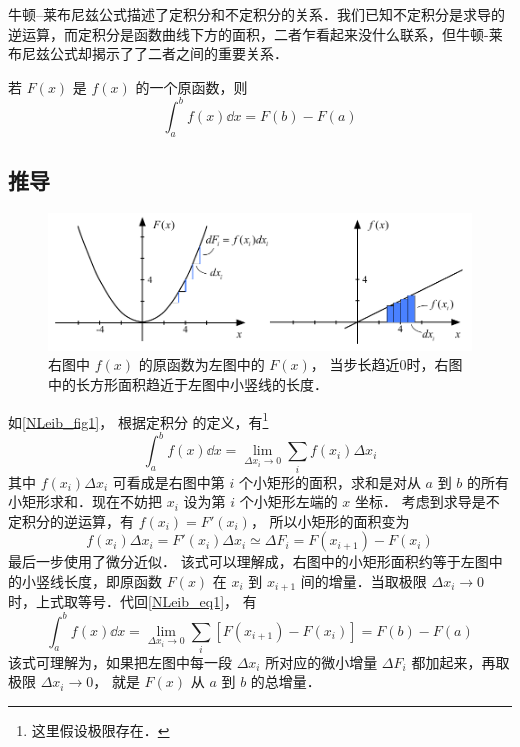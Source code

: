 

牛顿--莱布尼兹公式描述了定积分和不定积分的关系．我们已知不定积分是求导的逆运算，而定积分是函数曲线下方的面积，二者乍看起来没什么联系，但牛顿-莱布尼兹公式却揭示了了二者之间的重要关系．

若 $F(x)$ 是 $f(x)$ 的一个原函数，则
\begin{equation}\label{NLeib_eq1}
\int_a^b f(x) \dd{x}  = F(b) - F(a)
\end{equation}

\subsection{推导}
\begin{figure}[ht]
\centering
\includegraphics[width=13cm]{./figures/NLeib.pdf}
\caption{右图中 $f(x)$ 的原函数为左图中的 $F(x)$， 当步长趋近0时，右图中的长方形面积趋近于左图中小竖线的长度．}\label{NLeib_fig1}
\end{figure}

如\autoref{NLeib_fig1}， 根据定积分 的定义，有\footnote{这里假设极限存在．}
\begin{equation}
\int_a^b f(x) \dd{x}= \lim_{\Delta x_i\to 0}\sum_i f(x_i)\Delta x_i
\end{equation}
其中 $f(x_i)\Delta x_i$ 可看成是右图中第 $i$ 个小矩形的面积，求和是对从 $a$ 到 $b$ 的所有小矩形求和．现在不妨把 $x_i$ 设为第 $i$ 个小矩形左端的 $x$ 坐标． 考虑到求导是不定积分的逆运算，有 $f(x_i)=F'(x_i)$， 所以小矩形的面积变为
\begin{equation}
f(x_i)\Delta x_i = F'(x_i)\Delta x_i \simeq \Delta F_i = F(x_{i+1})-F(x_i)
\end{equation}
最后一步使用了微分近似． %
该式可以理解成，右图中的小矩形面积约等于左图中的小竖线长度，即原函数 $F(x)$ 在 $x_i$ 到 $x_{i+1}$ 间的增量．当取极限 $\Delta x_i \to 0$ 时，上式取等号．代回\autoref{NLeib_eq1}， 有
\begin{equation}
\int_a^b f(x) \dd{x}= \lim_{\Delta x_i\to 0}\sum_i [F(x_{i+1})-F(x_i)] = F(b)-F(a)
\end{equation}
该式可理解为，如果把左图中每一段 $\Delta x_i$ 所对应的微小增量 $\Delta F_i$ 都加起来，再取极限 $\Delta x_i \to 0$， 就是 $F(x)$ 从 $a$ 到 $b$ 的总增量．


